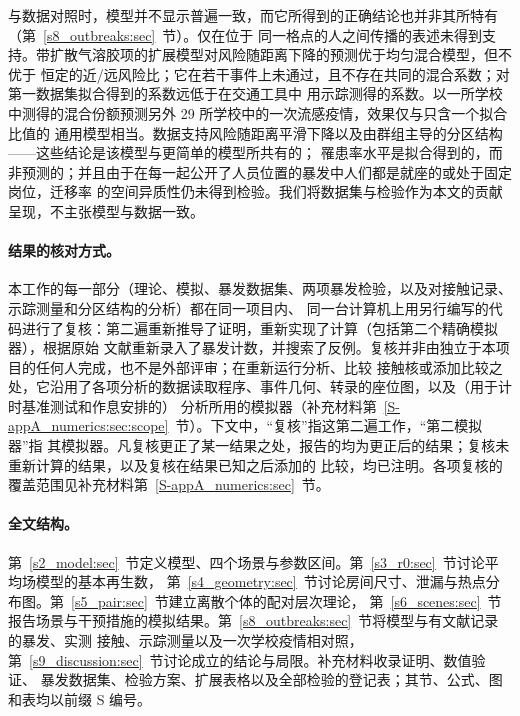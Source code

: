 与数据对照时，模型并不显示普遍一致，而它所得到的正确结论也并非其所特有（第~\ref{s8_outbreaks:sec}~节）。仅在位于
同一格点的人之间传播的表述未得到支持。带扩散气溶胶项的扩展模型对风险随距离下降的预测优于均匀混合模型，但不优于
恒定的近/远风险比；它在若干事件上未通过，且不存在共同的混合系数；对第一数据集拟合得到的系数远低于在交通工具中
用示踪测得的系数。以一所学校中测得的混合份额预测另外 29 所学校中的一次流感疫情，效果仅与只含一个拟合比值的
通用模型相当。数据支持风险随距离平滑下降以及由群组主导的分区结构——这些结论是该模型与更简单的模型所共有的；
罹患率水平是拟合得到的，而非预测的；并且由于在每一起公开了人员位置的暴发中人们都是就座的或处于固定岗位，迁移率
的空间异质性仍未得到检验。我们将数据集与检验作为本文的贡献呈现，不主张模型与数据一致。

\paragraph{结果的核对方式。}
本工作的每一部分（理论、模拟、暴发数据集、两项暴发检验，以及对接触记录、示踪测量和分区结构的分析）都在同一项目内、
同一台计算机上用另行编写的代码进行了复核：第二遍重新推导了证明，重新实现了计算（包括第二个精确模拟器），根据原始
文献重新录入了暴发计数，并搜索了反例。复核并非由独立于本项目的任何人完成，也不是外部评审；在重新运行分析、比较
接触核或添加比较之处，它沿用了各项分析的数据读取程序、事件几何、转录的座位图，以及（用于计时基准测试和作息安排的）
分析所用的模拟器（补充材料第~\ref{S-appA_numerics:sec:scope}~节）。下文中，“复核”指这第二遍工作，“第二模拟器”指
其模拟器。凡复核更正了某一结果之处，报告的均为更正后的结果；复核未重新计算的结果，以及复核在结果已知之后添加的
比较，均已注明。各项复核的覆盖范围见补充材料第~\ref{S-appA_numerics:sec}~节。

\paragraph{全文结构。}
第~\ref{s2_model:sec}~节定义模型、四个场景与参数区间。第~\ref{s3_r0:sec}~节讨论平均场模型的基本再生数，
第~\ref{s4_geometry:sec}~节讨论房间尺寸、泄漏与热点分布图。第~\ref{s5_pair:sec}~节建立离散个体的配对层次理论，
第~\ref{s6_scenes:sec}~节报告场景与干预措施的模拟结果。第~\ref{s8_outbreaks:sec}~节将模型与有文献记录的暴发、实测
接触、示踪测量以及一次学校疫情相对照，第~\ref{s9_discussion:sec}~节讨论成立的结论与局限。补充材料收录证明、数值验证、
暴发数据集、检验方案、扩展表格以及全部检验的登记表；其节、公式、图和表均以前缀 S 编号。
